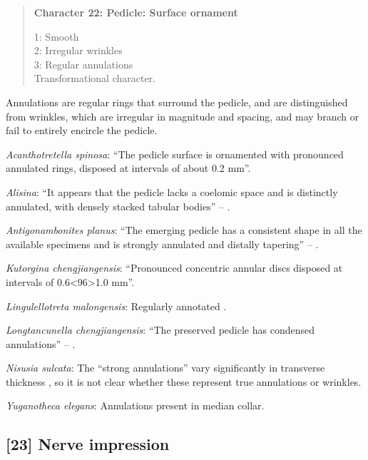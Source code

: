 \documentclass[openany]{book}
\theoremstyle{definition}
\theoremstyle{definition}
\theoremstyle{definition}
\theoremstyle{remark}
\begin{document}
\begin{quote}
\textbf{Character 22: Pedicle: Surface ornament}

1: Smooth\\
2: Irregular wrinkles\\
3: Regular annulations\\
Transformational character.
\end{quote}

Annulations are regular rings that surround the pedicle, and are
distinguished from wrinkles, which are irregular in magnitude and
spacing, and may branch or fail to entirely encircle the pedicle.

\hypertarget{Acanthotretella_spinosa-coding-22}{}
\emph{Acanthotretella spinosa}: ``The pedicle surface is ornamented with
pronounced annulated rings, disposed at intervals of about 0.2 mm''.

\hypertarget{Alisina-coding-22}{}
\emph{Alisina}: ``It appears that the pedicle lacks a coelomic space and
is distinctly annulated, with densely stacked tabular bodies'' --
\citet{Zhang2011Anobolellate}.

\hypertarget{Antigonambonites_planus-coding-22}{}
\emph{Antigonambonites planus}: ``The emerging pedicle has a consistent
shape in all the available specimens and is strongly annulated and
distally tapering'' -- \citet{Holmer2018Evolutionarysignificance}.

\hypertarget{Kutorgina_chengjiangensis-coding-22}{}
\emph{Kutorgina chengjiangensis}: ``Pronounced concentric annular discs
disposed at intervals of 0.6\textless{}96\textgreater{}1.0 mm''.

\hypertarget{Lingulellotreta_malongensis-coding-22}{}
\emph{Lingulellotreta malongensis}: Regularly annotated \citep[see fig.
14.9 in][]{Hou2017Brachiopoda}.

\hypertarget{Longtancunella_chengjiangensis-coding-22}{}
\emph{Longtancunella chengjiangensis}: ``The preserved pedicle has
condensed annulations'' -- \citet{Zhang2011Theexceptionally}.

\hypertarget{Nisusia_sulcata-coding-22}{}
\emph{Nisusia sulcata}: The ``strong annulations'' vary significantly in
transverse thickness \citep{Holmer2018Evolutionarysignificance}, so it
is not clear whether these represent true annulations or wrinkles.

\hypertarget{Yuganotheca_elegans-coding-22}{}
\emph{Yuganotheca elegans}: Annulations present in median collar.

\subsection*{{[}23{]} Nerve impression}\label{nerve-impression}
\end{document}
